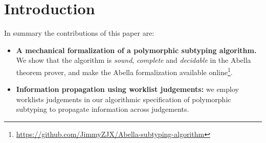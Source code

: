 \section{Introduction}



%


In summary the contributions of this paper are:

\begin{itemize}
\item {\bf A mechanical formalization of a polymorphic subtyping
    algorithm.} We show that the algorithm is \emph{sound},
  \emph{complete} and \emph{decidable} in the Abella theorem prover,
  and make the Abella formalization available online\footnote{\url{https://github.com/JimmyZJX/Abella-subtyping-algorithm}}.

\item {\bf Information propagation using worklist judgements:} we
  employ worklists judgements in our algorithmic specification of polymorphic subtyping
  to propagate information across judgements.

\end{itemize}
